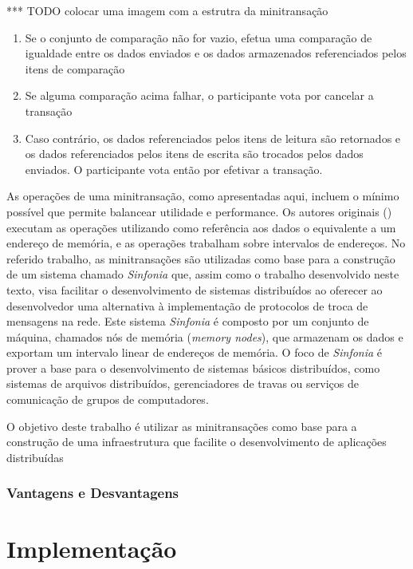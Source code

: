 \documentclass[11pt,twoside,a4paper]{book}
\begin{document}
*** TODO colocar uma imagem com a estrutra da minitransação

\begin{enumerate}
\item Se o conjunto de comparação não for vazio, efetua uma comparação de igualdade entre os dados enviados e os dados armazenados referenciados pelos itens de comparação
\item Se alguma comparação acima falhar, o participante vota por cancelar a transação
\item Caso contrário, os dados referenciados pelos itens de leitura são retornados e os dados referenciados pelos itens de escrita são trocados pelos dados enviados. O participante vota então por efetivar a transação.
\end{enumerate}

As operações de uma minitransação, como apresentadas aqui, incluem o mínimo possível que permite balancear utilidade e performance. Os autores originais (\cite{sinfonia}) executam as operações utilizando como referência aos dados o equivalente a um endereço de memória, e as operações trabalham sobre intervalos de endereços. No referido trabalho, as minitransações são utilizadas como base para a construção de um sistema chamado \emph{Sinfonia} que, assim como o trabalho desenvolvido neste texto, visa facilitar o desenvolvimento de sistemas distribuídos ao oferecer ao desenvolvedor uma alternativa à implementação de protocolos de troca de mensagens na rede. Este sistema \emph{Sinfonia} é composto por um conjunto de máquina, chamados nós de memória (\emph{memory nodes}), que armazenam os dados e exportam um intervalo linear de endereços de memória. O foco de \emph{Sinfonia} é prover a base para o desenvolvimento de sistemas básicos distribuídos, como sistemas de arquivos distribuídos, gerenciadores de travas ou serviços de comunicação de grupos de computadores.

O objetivo deste trabalho é utilizar as minitransações como base para a construção de uma infraestrutura que facilite o desenvolvimento de aplicações distribuídas

\subsection{Vantagens e Desvantagens}
\label{subsec:pros-contras-minitransacoes}

\chapter{Implementação}
\label{chap:implementacao}
\end{document}
